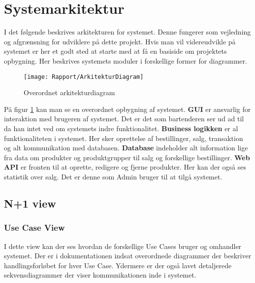 \section{Systemarkitektur}

I det følgende beskrives arkitekturen for systemet. Denne fungerer som vejledning og afgrænsning for udviklere på dette projekt. Hvis man vil videreudvikle på systemet er her et godt sted at starte med at få en basiside om projektets opbygning. Her beskrives systemets moduler i forskellige former for diagrammer. 

\begin{figure}[H]
	\centering
	\texttt{[image: Rapport/ArkitekturDiagram]}
	\caption{Overordnet arkitekturdiagram}
	\label{ArkiDia}
\end{figure}

På figur \ref{ArkiDia} kan man se en overordnet opbygning af systemet. \textbf{GUI} er ansvarlig for interaktion med brugeren af systemet. Det er det som bartenderen ser ud ad til da han intet ved om systemets indre funktionalitet.
\newline\newline
\textbf{Business logikken} er al funktionaliteten i systemet. Her sker oprettelse af bestillinger, salg, transaktion og alt kommunikation med databasen. 
\newline\newline
\textbf{Database} indeholder alt information lige fra data om produkter og produktgrupper til salg og forskellige bestillinger.
\newline\newline
\textbf{Web API} er fronten til at oprette, redigere og fjerne produkter. Her kan der også ses statistik over salg. Det er denne som Admin bruger til at tilgå systemet. 

\subsection{N+1 view}

\subsubsection{Use Case View}
I dette view kan der ses hvordan de forskellige Use Cases bruger og omhandler systemet. Der er i dokumentationen indsat overordnede diagrammer der beskriver handlingsforløbet for hver Use Case. Ydermere er der også lavet detaljerede sekvensdiagrammer der viser kommunikationen inde i systemet. 

